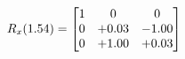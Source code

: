 \documentclass[preview]{standalone}
\begin{document}
\begin{align*}
\special{dvisvgm:raw <g id='unique000'>}R_{x}(1.54) = \begin{bmatrix}1 & 0 & 0 \\0 & +0.03 & -1.00 \\0 & +1.00 & +0.03\end{bmatrix}\special{dvisvgm:raw </g>}
\end{align*}
\end{document}
